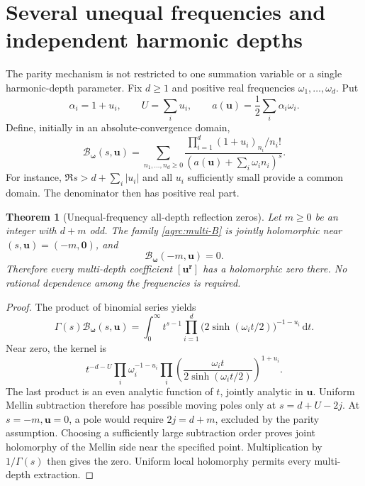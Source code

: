 \documentclass[11pt]{article}
\numberwithin{equation}{section}
\newtheorem{theorem}{Theorem}[section]
\theoremstyle{definition}\newtheorem{definition}[theorem]{Definition}
\theoremstyle{remark}\newtheorem{remark}[theorem]{Remark}
\newcommand{\Bcal}{\mathcal B}
\newcommand{\dd}{\,\mathrm d}
\begin{document}
\section{Several unequal frequencies and independent harmonic depths}
\label{agrc:multifrequency}

The parity mechanism is not restricted to one summation variable or a
single harmonic-depth parameter. Fix $d\geq1$ and positive real
frequencies $\omega_1,\ldots,\omega_d$. Put
\[
 \alpha_i=1+u_i,\qquad U=\sum_i u_i,
 \qquad a(\bm u)=\frac12\sum_i\alpha_i\omega_i.
\]
Define, initially in an absolute-convergence domain,
\begin{equation}\label{agrc:multi-B}
 \Bcal_{\bm\omega}(s,\bm u)=
 \sum_{n_1,\ldots,n_d\geq0}
 \frac{\prod_{i=1}^d(1+u_i)_{n_i}/n_i!}
      {\left(a(\bm u)+\sum_i\omega_i n_i\right)^s}.
\end{equation}
For instance, $\Re s>d+\sum_i|u_i|$ and all $u_i$ sufficiently small
provide a common domain. The denominator then has positive real part.

\begin{theorem}[Unequal-frequency all-depth reflection zeros]
\label{agrc:multi-zero}
Let $m\geq0$ be an integer with $d+m$ odd. The family
\eqref{agrc:multi-B} is jointly holomorphic near $(s,\bm u)=(-m,\bm0)$,
and
\begin{equation}\label{agrc:multi-zero-eq}
 \Bcal_{\bm\omega}(-m,\bm u)=0.
\end{equation}
Therefore every multi-depth coefficient $[\bm u^{\bm r}]$ has a
holomorphic zero there. No rational dependence among the frequencies
is required.
\end{theorem}
\begin{proof}
The product of binomial series yields
\begin{equation}\label{agrc:multi-Mellin}
 \Gamma(s)\Bcal_{\bm\omega}(s,\bm u)
 =\int_0^\infty t^{s-1}
             \prod_{i=1}^d\bigl(2\sinh(\omega_i t/2)\bigr)^{-1-u_i}
                                                      \dd t.
\end{equation}
Near zero, the kernel is
\[
 t^{-d-U}\prod_i\omega_i^{-1-u_i}
  \prod_i\left(\frac{\omega_i t}{2\sinh(\omega_i t/2)}\right)^{1+u_i}.
\]
The last product is an even analytic function of $t$, jointly analytic
in $\bm u$. Uniform Mellin subtraction therefore has possible moving
poles only at $s=d+U-2j$. At $s=-m,\bm u=0$, a pole would require
$2j=d+m$, excluded by the parity assumption. Choosing a sufficiently
large subtraction order proves joint holomorphy of the Mellin side
near the specified point. Multiplication by $1/\Gamma(s)$ then gives
the zero. Uniform local holomorphy permits every multi-depth extraction.
\end{proof}
\end{document}
